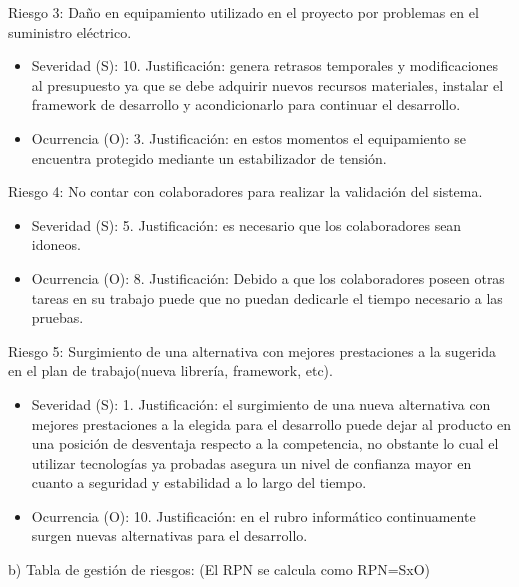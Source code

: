 \documentclass[
11pt, %
]{charter}
\begin{document}
Riesgo 3: Daño en equipamiento utilizado en el proyecto por problemas en el suministro eléctrico.
\begin{itemize}
	\item Severidad (S): 10.\newline 
	Justificación: genera retrasos temporales y modificaciones al presupuesto ya que se debe adquirir nuevos recursos materiales, instalar el framework de desarrollo y acondicionarlo para continuar el desarrollo.
	\item Ocurrencia (O): 3.\newline 
	Justificación: en estos momentos el equipamiento se encuentra protegido mediante un estabilizador de tensión.
\end{itemize}	
Riesgo 4: No contar con colaboradores para realizar la validación del sistema.
\begin{itemize}
	\item Severidad (S): 5.\newline 
	Justificación: es necesario que los colaboradores sean idoneos.
	\item Ocurrencia (O): 8.\newline 
	Justificación: Debido a que los colaboradores poseen otras tareas en su trabajo puede que no puedan dedicarle el tiempo necesario a las pruebas.
\end{itemize}
Riesgo 5: Surgimiento de una alternativa con mejores prestaciones a la sugerida en el plan de trabajo(nueva librería, framework, etc).
\begin{itemize}
	\item Severidad (S): 1.\newline 
	Justificación: el surgimiento de una nueva alternativa con mejores prestaciones a la elegida para el desarrollo puede dejar al producto en una posición de desventaja respecto a la competencia, no obstante lo cual el utilizar tecnologías ya probadas asegura un nivel de confianza mayor en cuanto a seguridad y estabilidad a lo largo del tiempo.
	\item Ocurrencia (O): 10.\newline 
	Justificación: en el rubro informático continuamente surgen nuevas alternativas para el desarrollo. 	
		 
	
\end{itemize}


b) Tabla de gestión de riesgos:      (El RPN se calcula como RPN=SxO)
\end{document}
